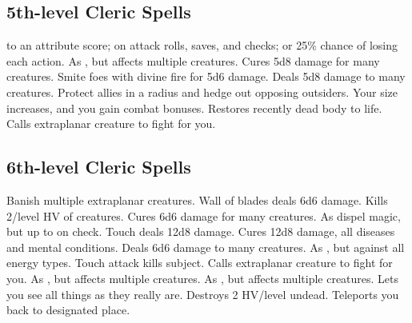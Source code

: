 \subsection{5th-level Cleric Spells}
\begin{spelllist}
    to an attribute score;  on attack rolls, saves, and checks; or 25\% chance of losing each action.
   As , but affects multiple creatures.
   Cures 5d8 damage for many creatures.
   Smite foes with divine fire for 5d6 damage.
   Deals 5d8 damage to many creatures.
   Protect allies in a \areamed radius and hedge out opposing outsiders.
   Your size increases, and you gain combat bonuses.
   Restores recently dead body to life.
   Calls extraplanar creature to fight for you.
\end{spelllist}

\subsection{6th-level Cleric Spells}
\begin{spelllist}
   Banish multiple extraplanar creatures. 
   Wall of blades deals 6d6 damage.
  \M Kills 2/level HV of creatures.
   Cures 6d6 damage for many creatures.
   As dispel magic, but up to  on check.
   Touch deals 12d8 damage.
   Cures 12d8 damage, all diseases and mental conditions.
   Deals 6d6 damage to many creatures.
   As , but against all energy types.
   Touch attack kills subject.
   Calls extraplanar creature to fight for you.
   As , but affects multiple creatures.
   As , but affects multiple creatures.
  \M Lets you see all things as they really are.
  \M Destroys 2 HV/level undead.
   Teleports you back to designated place.
\end{spelllist}

